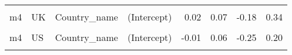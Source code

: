 \begin{table}
\begin{tabular}[t]{llllrrrr}
\cellcolor{gray!10}{m4} & \cellcolor{gray!10}{SE} & \cellcolor{gray!10}{Country\_name} & \cellcolor{gray!10}{EPS} & \cellcolor{gray!10}{-0.06} & \cellcolor{gray!10}{0.04} & \cellcolor{gray!10}{-0.15} & \cellcolor{gray!10}{0.03}\\
m4 & UK & Country\_name & (Intercept) & 0.02 & 0.07 & -0.18 & 0.34\\
\cellcolor{gray!10}{m4} & \cellcolor{gray!10}{UK} & \cellcolor{gray!10}{Country\_name} & \cellcolor{gray!10}{EPS} & \cellcolor{gray!10}{0.04} & \cellcolor{gray!10}{0.04} & \cellcolor{gray!10}{-0.05} & \cellcolor{gray!10}{0.14}\\
m4 & US & Country\_name & (Intercept) & -0.01 & 0.06 & -0.25 & 0.20\\
\cellcolor{gray!10}{m4} & \cellcolor{gray!10}{US} & \cellcolor{gray!10}{Country\_name} & \cellcolor{gray!10}{EPS} & \cellcolor{gray!10}{-0.01} & \cellcolor{gray!10}{0.04} & \cellcolor{gray!10}{-0.11} & \cellcolor{gray!10}{0.08}\\
\bottomrule
\end{tabular}
\end{table}
